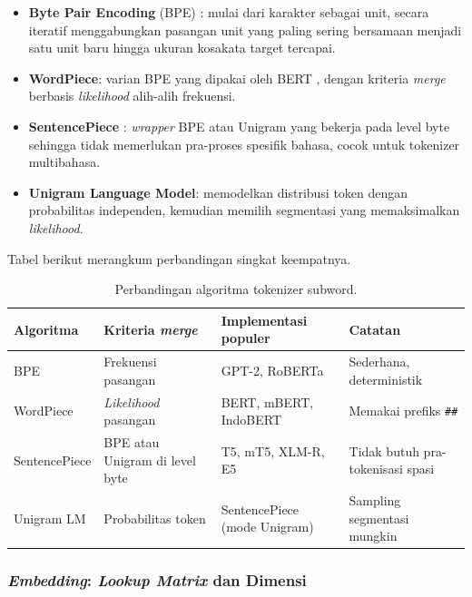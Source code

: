 \begin{itemize}
    \item \textbf{Byte Pair Encoding} (BPE) \citep{sennrichBPE2016}: mulai dari karakter sebagai unit, secara iteratif menggabungkan pasangan unit yang paling sering bersamaan menjadi satu unit baru hingga ukuran kosakata target tercapai.
    \item \textbf{WordPiece}: varian BPE yang dipakai oleh BERT \citep{devlinBERT2019}, dengan kriteria \textit{merge} berbasis \textit{likelihood} alih-alih frekuensi.
    \item \textbf{SentencePiece} \citep{kudoSentencePiece2018}: \textit{wrapper} BPE atau Unigram yang bekerja pada level byte sehingga tidak memerlukan pra-proses spesifik bahasa, cocok untuk tokenizer multibahasa.
    \item \textbf{Unigram Language Model}: memodelkan distribusi token dengan probabilitas independen, kemudian memilih segmentasi yang memaksimalkan \textit{likelihood}.
\end{itemize}

Tabel berikut merangkum perbandingan singkat keempatnya.

\begin{table}[htbp]
\centering
\caption{Perbandingan algoritma tokenizer subword.}
\label{tab:tokenizer}
\setlength{\tabcolsep}{4pt}
\begin{tabular}{p{2.4cm} p{3.7cm} p{3.6cm} p{2.6cm}}
\toprule
\textbf{Algoritma} & \textbf{Kriteria \textit{merge}} & \textbf{Implementasi populer} & \textbf{Catatan} \\
\midrule
BPE & Frekuensi pasangan & GPT-2, RoBERTa & Sederhana, deterministik \\
WordPiece & \textit{Likelihood} pasangan & BERT, mBERT, IndoBERT & Memakai prefiks \texttt{\#\#} \\
SentencePiece & BPE atau Unigram di level byte & T5, mT5, XLM-R, E5 & Tidak butuh pra-tokenisasi spasi \\
Unigram LM & Probabilitas token & SentencePiece (mode Unigram) & Sampling segmentasi mungkin \\
\bottomrule
\end{tabular}
\end{table}

\subsubsection{\textit{Embedding}: \textit{Lookup Matrix} dan Dimensi}


